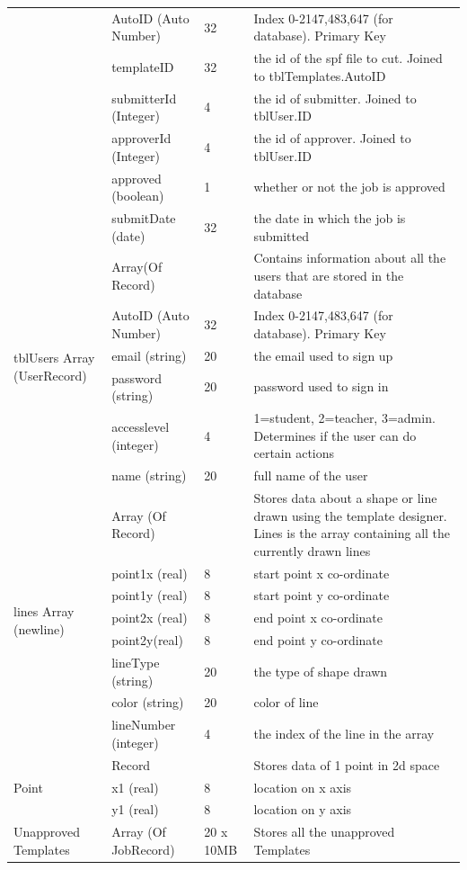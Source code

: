 \documentclass[oneside,openany,11pt,a4paper]{report}
\begin{document}
\begin{longtable}{|p{2cm}|p{3cm}|p{1.5cm}|p{6cm}|}
		& Auto\textunderscore ID (Auto Number) & 32 & Index 0-2147,483,647 (for database). Primary Key  \\
		& template\textunderscore ID & 32 & the id of the spf file to cut. Joined to tblTemplates.Auto\textunderscore ID \\
		& submitterId (Integer) & 4 & the id of submitter. Joined to tblUser.\textunderscore ID \\
		& approverId (Integer) & 4 & the id of approver. Joined to tblUser.\textunderscore ID \\
		& approved (boolean) & 1 & whether or not the job is approved \\
		& submitDate (date) & 32 & the date in which the job is submitted\\
		\hline
		
			\multirow{6}{*}{\parbox{2cm}{tblUsers Array (UserRecord)} }
		& Array(Of Record) &   &   Contains information about all the users that are stored in the database \\ 
		
		& Auto\textunderscore ID (Auto Number) & 32 & Index 0-2147,483,647 (for database). Primary Key  \\
		& email (string) & 20 & the email used to sign up \\
		& password (string) & 20 & password used to sign in\\
		& accesslevel (integer) & 4 & 1=student, 2=teacher, 3=admin. Determines if the user can do certain actions \\
		& name (string) & 20 & full name of the user \\
		\hline

		\multirow{8}{*}{\parbox{2cm}{lines Array (newline)}}
		& Array (Of Record) & & Stores data about a shape or line drawn using the template designer. Lines is the array containing all the currently drawn lines \\
		& point1x (real) & 8 &start point x co-ordinate \\
			& point1y (real) & 8 &start point y co-ordinate \\
				& point2x (real) & 8 &end point x co-ordinate \\
					& point2y(real) & 8 &end point y co-ordinate \\
						& lineType (string) & 20 & the type of shape drawn\\
						& color (string) & 20 & color of line\\
						& lineNumber (integer) & 4 & the index of the line in the array\\\hline
		\multirow{3}{*}{\parbox{2cm}{Point}}
		& Record & & Stores data of 1 point in 2d space \\
		& x1 (real) & 8 & location on x axis \\
		& y1 (real) & 8 & location on y axis \\
		\hline
		
		Unapproved Templates
		& Array (Of JobRecord) & 20 x 10MB & Stores all the unapproved Templates
		\\ \hline
	
\end{longtable}
\end{document}
